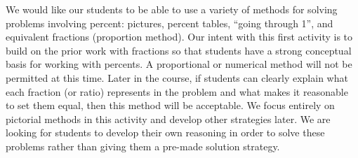 \documentclass[nooutcomes,noauthor,handout]{ximera}
\begin{document}
\newpage

\begin{instructorNotes}
We would like our students to be able to use a variety of methods for solving problems involving percent: pictures, percent tables, ``going through 1'', and equivalent fractions (proportion method). Our intent with this first activity is to build on the prior work with fractions so that students have a strong conceptual basis for working with percents.  A proportional or numerical method will not be permitted at this time.  Later in the course, if students can clearly explain what each fraction (or ratio) represents in the problem and what makes it reasonable to set them equal, then this method will be acceptable.  We focus entirely on pictorial methods in this activity and develop other strategies later.   We are looking for students to develop their own reasoning in order to solve these problems rather than giving them a pre-made solution strategy. 


\end{instructorNotes}
\end{document}
